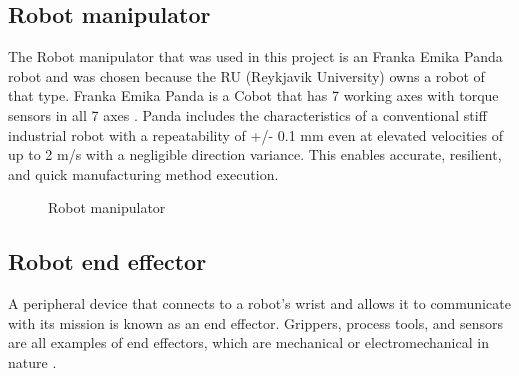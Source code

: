 \subsection{Robot manipulator\label{subsec:robot}}
The Robot manipulator that was used in this project is an Franka Emika Panda robot and was chosen because the RU (Reykjavik University) owns a robot of that type. Franka Emika Panda is a Cobot that has 7 working axes with torque sensors in all 7 axes \cite{gmbh_franka_nodate}. Panda includes the characteristics of a conventional stiff industrial robot with a repeatability of +/- 0.1 mm even at elevated velocities of up to 2 m/s with a negligible direction variance. This enables accurate, resilient, and quick manufacturing method execution. 
\begin{figure}[h]
    \centering
    \hfill
    \caption{Robot manipulator}
    \label{figure: frankaemika}
\end{figure}

\subsection{Robot end effector\label{subsec:robotend}}
A peripheral device that connects to a robot's wrist and allows it to communicate with its mission is known as an end effector. Grippers, process tools, and sensors are all examples of end effectors, which are mechanical or electromechanical in nature \cite{wilson_relative_1996}. 

